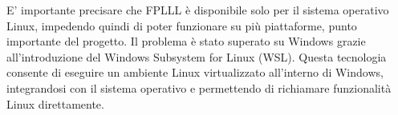 E' importante precisare che FPLLL è disponibile solo per il sistema operativo Linux, impedendo
quindi di poter funzionare su più piattaforme, punto importante del progetto. Il problema 
è stato superato su Windows grazie all'introduzione del Windows Subsystem for Linux (WSL). 
Questa tecnologia consente di eseguire un ambiente Linux virtualizzato  
all'interno di Windows, integrandosi con il sistema operativo e permettendo di richiamare 
funzionalità Linux direttamente.

%
%

%
%
